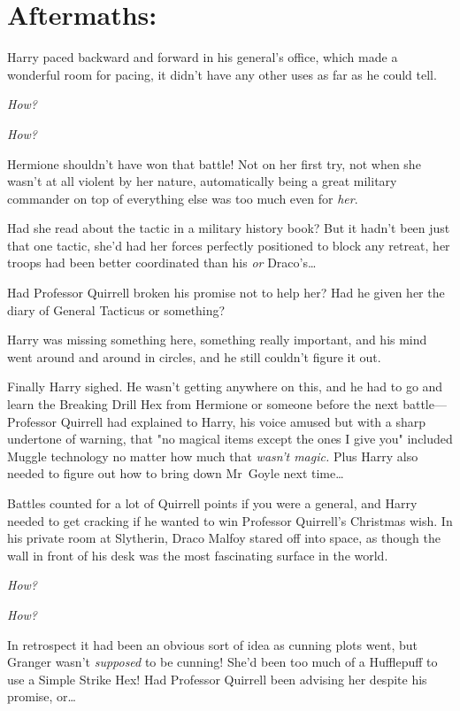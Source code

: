 
\section{Aftermaths:}

Harry paced backward and forward in his general's office, which made a
wonderful room for pacing, it didn't have any other uses as far as he could
tell.

\emph{How?}

\emph{How?}

Hermione shouldn't have won that battle! Not on her first try, not when she
wasn't at all violent by her nature, automatically being a great military
commander on top of everything else was too much even for \emph{her}.

Had she read about the tactic in a military history book? But it hadn't been
just that one tactic, she'd had her forces perfectly positioned to block any
retreat, her troops had been better coordinated than his \emph{or}
Draco's…

Had Professor Quirrell broken his promise not to help her? Had he given her the
diary of General Tacticus or something?

Harry was missing something here, something really important, and his mind went
around and around in circles, and he still couldn't figure it out.

Finally Harry sighed. He wasn't getting anywhere on this, and he had to go and
learn the Breaking Drill Hex from Hermione or someone before the next
battle—Professor Quirrell had explained to Harry, his voice amused but with a
sharp undertone of warning, that "no magical items except the ones I give you"
included Muggle technology no matter how much that \emph{wasn't magic.} Plus
Harry also needed to figure out how to bring down Mr~Goyle next time…

Battles counted for a lot of Quirrell points if you were a general, and Harry
needed to get cracking if he wanted to win Professor Quirrell's Christmas wish.
\later
In his private room at Slytherin, Draco Malfoy stared off into space, as though
the wall in front of his desk was the most fascinating surface in the world.

\emph{How?}

\emph{How?}

In retrospect it had been an obvious sort of idea as cunning plots went, but
Granger wasn't \emph{supposed} to be cunning! She'd been too much of a
Hufflepuff to use a Simple Strike Hex! Had Professor Quirrell been advising her
despite his promise, or…

